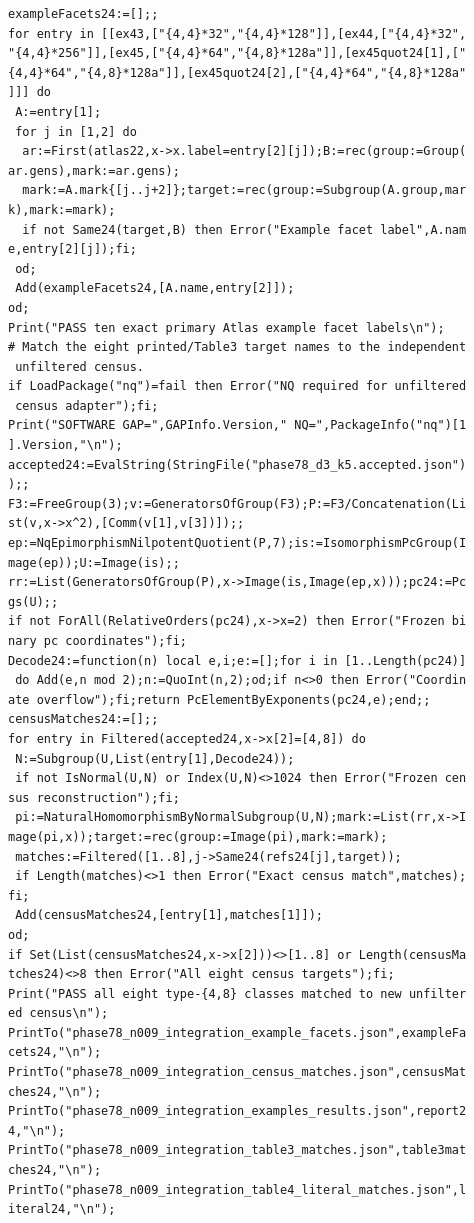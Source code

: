 \documentclass[
  11pt,
  a4paper,
]{article}
\begin{document}
\begin{verbatim}
exampleFacets24:=[];;
for entry in [[ex43,["{4,4}*32","{4,4}*128"]],[ex44,["{4,4}*32",
"{4,4}*256"]],[ex45,["{4,4}*64","{4,8}*128a"]],[ex45quot24[1],["
{4,4}*64","{4,8}*128a"]],[ex45quot24[2],["{4,4}*64","{4,8}*128a"
]]] do
 A:=entry[1];
 for j in [1,2] do
  ar:=First(atlas22,x->x.label=entry[2][j]);B:=rec(group:=Group(
ar.gens),mark:=ar.gens);
  mark:=A.mark{[j..j+2]};target:=rec(group:=Subgroup(A.group,mar
k),mark:=mark);
  if not Same24(target,B) then Error("Example facet label",A.nam
e,entry[2][j]);fi;
 od;
 Add(exampleFacets24,[A.name,entry[2]]);
od;
Print("PASS ten exact primary Atlas example facet labels\n");
# Match the eight printed/Table3 target names to the independent
 unfiltered census.
if LoadPackage("nq")=fail then Error("NQ required for unfiltered
 census adapter");fi;
Print("SOFTWARE GAP=",GAPInfo.Version," NQ=",PackageInfo("nq")[1
].Version,"\n");
accepted24:=EvalString(StringFile("phase78_d3_k5.accepted.json")
);;
F3:=FreeGroup(3);v:=GeneratorsOfGroup(F3);P:=F3/Concatenation(Li
st(v,x->x^2),[Comm(v[1],v[3])]);;
ep:=NqEpimorphismNilpotentQuotient(P,7);is:=IsomorphismPcGroup(I
mage(ep));U:=Image(is);;
rr:=List(GeneratorsOfGroup(P),x->Image(is,Image(ep,x)));pc24:=Pc
gs(U);;
if not ForAll(RelativeOrders(pc24),x->x=2) then Error("Frozen bi
nary pc coordinates");fi;
Decode24:=function(n) local e,i;e:=[];for i in [1..Length(pc24)]
 do Add(e,n mod 2);n:=QuoInt(n,2);od;if n<>0 then Error("Coordin
ate overflow");fi;return PcElementByExponents(pc24,e);end;;
censusMatches24:=[];;
for entry in Filtered(accepted24,x->x[2]=[4,8]) do
 N:=Subgroup(U,List(entry[1],Decode24));
 if not IsNormal(U,N) or Index(U,N)<>1024 then Error("Frozen cen
sus reconstruction");fi;
 pi:=NaturalHomomorphismByNormalSubgroup(U,N);mark:=List(rr,x->I
mage(pi,x));target:=rec(group:=Image(pi),mark:=mark);
 matches:=Filtered([1..8],j->Same24(refs24[j],target));
 if Length(matches)<>1 then Error("Exact census match",matches);
fi;
 Add(censusMatches24,[entry[1],matches[1]]);
od;
if Set(List(censusMatches24,x->x[2]))<>[1..8] or Length(censusMa
tches24)<>8 then Error("All eight census targets");fi;
Print("PASS all eight type-{4,8} classes matched to new unfilter
ed census\n");
PrintTo("phase78_n009_integration_example_facets.json",exampleFa
cets24,"\n");
PrintTo("phase78_n009_integration_census_matches.json",censusMat
ches24,"\n");
PrintTo("phase78_n009_integration_examples_results.json",report2
4,"\n");
PrintTo("phase78_n009_integration_table3_matches.json",table3mat
ches24,"\n");
PrintTo("phase78_n009_integration_table4_literal_matches.json",l
iteral24,"\n");


\end{verbatim}
\end{document}
